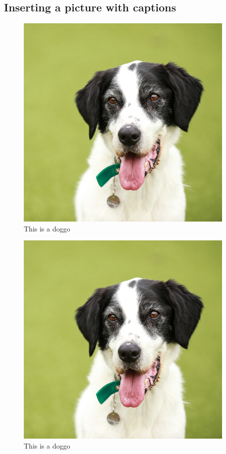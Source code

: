 \documentclass[11pt]{article}
\begin{document}
\subsection*{Inserting a picture with captions}
\begin{figure}[H]
	\begin{center}
	\includegraphics[scale=0.5]{dog1}
	\caption{This is a doggo}
	\end{center}
\end{figure}

\begin{figure}[H]
	\begin{center}
	\includegraphics[scale=0.5]{dog1}
	\caption{This is a doggo}
	\end{center}
\end{figure}
\end{document}
